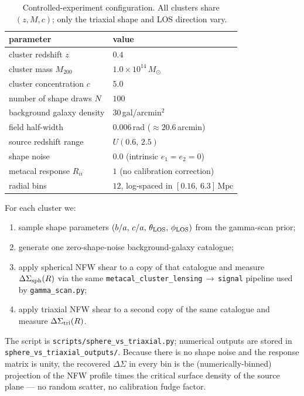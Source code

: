 \documentclass[11pt,a4paper]{article}
\newcommand{\DS}{\Delta\Sigma}
\newcommand{\Msun}{\,M_{\odot}}
\newcommand{\Mpc}{\,\mathrm{Mpc}}
\begin{document}
\begin{table}[htbp]
  \centering
  \begin{tabular}{ll}
    \toprule
    parameter & value\\
    \midrule
    cluster redshift $z$               & $0.4$\\
    cluster mass $M_{200}$             & $1.0\times 10^{14}\Msun$\\
    cluster concentration $c$          & $5.0$\\
    number of shape draws $N$          & $100$\\
    background galaxy density          & $30$\,gal/arcmin$^2$\\
    field half-width                   & $0.006$\,rad ($\approx 20.6$\,arcmin)\\
    source redshift range              & $U(0.6,\,2.5)$\\
    shape noise                        & $0.0$ (intrinsic $e_1=e_2=0$)\\
    metacal response $R_{ii}$          & $1$ (no calibration correction)\\
    radial bins                        & $12$, log-spaced in $[0.16,\,6.3]\Mpc$\\
    \bottomrule
  \end{tabular}
  \caption{Controlled-experiment configuration.  All clusters share
  $(z,M,c)$; only the triaxial shape and LOS direction vary.}
  \label{tab:config}
\end{table}

For each cluster we:
\begin{enumerate}
\item sample shape parameters $(b/a,\,c/a,\,\theta_{\rm LOS},\,\phi_{\rm LOS})$
      from the gamma-scan prior;
\item generate one zero-shape-noise background-galaxy catalogue;
\item apply spherical NFW shear to a copy of that catalogue and measure
      $\DS_{\rm sph}(R)$ via the same
      \texttt{metacal\_cluster\_lensing}\,$\to$\,\texttt{signal} pipeline used
      by \texttt{gamma\_scan.py};
\item apply triaxial NFW shear to a second copy of the same catalogue and
      measure $\DS_{\rm tri}(R)$.
\end{enumerate}

The script is \texttt{scripts/sphere\_vs\_triaxial.py}; numerical outputs are
stored in \texttt{sphere\_vs\_triaxial\_outputs/}.  Because there is no shape
noise and the response matrix is unity, the recovered $\DS$ in every bin is
the (numerically-binned) projection of the NFW profile times the critical
surface density of the source plane --- no random scatter, no calibration
fudge factor.
\end{document}
